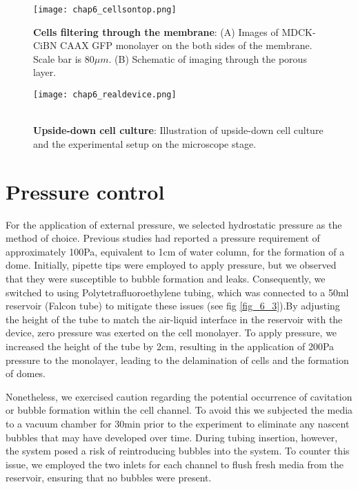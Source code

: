 \begin{figure}[]
	\centering
	\texttt{[image: chap6\_cellsontop.png]}
	\caption{ \textbf{Cells filtering through the membrane}: (A) Images of MDCK-CiBN CAAX GFP monolayer on the both sides of the membrane. Scale bar is $80\mu m$. (B) Schematic of imaging through the porous layer.	}\label{fig_6_4}
\end{figure}

\begin{figure}[]
	\begin{minipage}[c]{0.7\textwidth}
		\texttt{[image: chap6\_realdevice.png]}
	\end{minipage}\hfill
	\begin{minipage}[c]{0.27\textwidth}
		\caption{\\ \textbf{Upside-down cell culture}: Illustration of upside-down cell culture and the experimental setup on the microscope stage.
		}\label{fig_6_5}
	\end{minipage}
\end{figure}

\hypertarget{pressure-control}{%
\section{Pressure control}\label{pressure-control}}

For the application of external pressure, we selected hydrostatic pressure as the method of choice. Previous studies had reported a pressure requirement of approximately 100\unit{\pascal}, equivalent to 1\unit{\cm} of water column, for the formation of a dome. Initially, pipette tips were employed to apply pressure, but we observed that they were susceptible to bubble formation and leaks. Consequently, we switched to using Polytetrafluoroethylene tubing, which was connected to a 50\unit{\ml} reservoir (Falcon tube) to mitigate these issues (see fig \ref{fig_6_3}).By adjusting the height of the tube to match the air-liquid interface in the reservoir with the device, zero pressure was exerted on the cell monolayer. To apply pressure, we increased the height of the tube by 2\unit{\cm}, resulting in the application of 200\unit{\pascal} pressure to the monolayer, leading to the delamination of cells and the formation of domes.

Nonetheless, we exercised caution regarding the potential occurrence of cavitation or bubble formation within the cell channel. To avoid this we subjected the media to a vacuum chamber for 30\unit{\minute} prior to the experiment to eliminate any nascent bubbles that may have developed over time. During tubing insertion, however, the system posed a risk of reintroducing bubbles into the system. To counter this issue, we employed the two inlets for each channel to flush fresh media from the reservoir, ensuring that no bubbles were present.

